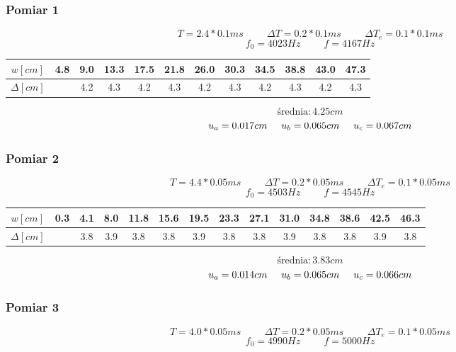 \documentclass[12pt,a4paper]{article}
\begin{document}
\subsubsection{Pomiar 1}
$$
T = 2.4*0.1ms \hspace{1cm} \Delta T = 0.2*0.1ms \hspace{1cm} \Delta T_e = 0.1*0.1ms 
$$
$$
f_0 = 4023Hz \hspace{1cm} f=4167Hz
$$

\begin{center}
\begin{tabular}{|c|ccccccccccc|}
\hline 
$w[cm]$ & 4.8& 9.0& 13.3& 17.5& 21.8& 26.0& 30.3& 34.5& 38.8& 43.0& 47.3 \\ 
\hline 
$\Delta[cm]$ & & 4.2& 4.3& 4.2& 4.3& 4.2& 4.3& 4.2& 4.3& 4.2& 4.3 \\ 
\hline 
\end{tabular} 
\end{center}


$$\text{średnia}: 4.25cm$$
$$u_a = 0.017cm \hspace{0.5cm} u_b = 0.065cm \hspace{0.5cm} u_c = 0.067cm $$

\subsubsection{Pomiar 2}
$$
T = 4.4*0.05ms \hspace{1cm} \Delta T = 0.2*0.05ms \hspace{1cm} \Delta T_e = 0.1*0.05ms 
$$
$$
f_0 = 4503 Hz \hspace{1cm} f=4545Hz
$$

\begin{center}
\begin{tabular}{|c|ccccccccccccc|}
\hline 
$w[cm]$ & 0.3 & 4.1 & 8.0& 11.8& 15.6& 19.5& 23.3& 27.1& 31.0 &34.8& 38.6 &42.5& 46.3 \\ 
\hline 
$\Delta[cm]$ & & 3.8& 3.9& 3.8& 3.8& 3.9& 3.8& 3.8& 3.9& 3.8 &3.8 &3.9& 3.8 \\ 
\hline 
\end{tabular} 
\end{center}

$$\text{średnia}: 3.83cm$$
$$u_a = 0.014cm \hspace{0.5cm} u_b = 0.065cm \hspace{0.5cm} u_c = 0.066cm $$

\subsubsection{Pomiar 3}
$$
T = 4.0*0.05ms \hspace{1cm} \Delta T = 0.2*0.05ms \hspace{1cm} \Delta T_e = 0.1*0.05ms 
$$
$$
f_0 = 4990 Hz \hspace{1cm} f=5000Hz
$$
\end{document}
